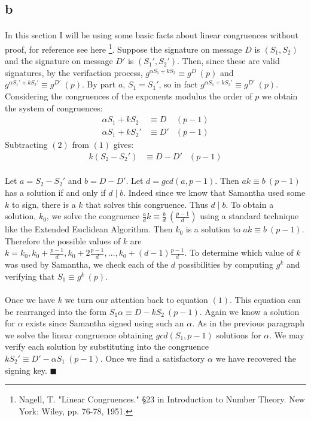 \documentclass[letterpaper,12pt,oneside,onecolumn]{report}
\begin{document}
\subsection*{b}
\paragraph{}
In this section I will be using some basic facts about linear congruences without proof, for reference see here \footnote{Nagell, T. "Linear Congruences." §23 in Introduction to Number Theory. New York: Wiley, pp. 76-78, 1951.}. Suppose the signature on message $D$ is $(S_1,S_2)$ and the signature on message $D'$ is $(S_1', S_2')$. Then, since these are valid signatures, by the verifaction process, $g^{\alpha S_1 + kS_2} \equiv g^D\ (p)$ and $g^{\alpha S_1' + kS_2'} \equiv g^{D'}\ (p)$. By part $a$, $S_1 = S_1'$, so in fact $g^{\alpha S_1 + kS_2'} \equiv g^{D'}\ (p)$. Considering the congruences of the exponents modulus the order of $p$ we obtain the system of congruences:
\begin{align}
\alpha S_1 + k S_2 &\equiv D &(p-1) \\
\alpha S_1 + k S_2' &\equiv D' &(p-1)
\end{align}
Subtracting $(2)$ from $(1)$ gives:
\begin{align}
k(S_2 - S_2') &\equiv D-D' &(p-1)
\end{align}
\paragraph{}
Let $a = S_2 - S_2'$ and $b = D - D'$. Let $d = gcd(a, p-1)$. Then $ak \equiv b\ (p-1)$ has a solution if and only if $d \mid b$. Indeed since we know that Samantha used some $k$ to sign, there is a $k$ that solves this congruence. Thus $d \mid b$. To obtain a solution, $k_0$, we solve the congruence $\frac{a}{d}k \equiv \frac{b}{d}\ (\frac{p-1}{d})$ using a standard technique like the Extended Euclidean Algorithm. Then $k_0$ is a solution to $ak \equiv b\ (p-1)$. Therefore the possible values of $k$ are $k = k_0, k_0 + \frac{p-1}{d}, k_0 + 2\frac{p-1}{d}, \dots, k_0 + (d-1)\frac{p-1}{d}$. To determine which value of $k$ was used by Samantha, we check each of the $d$ possibilities by computing $g^k$ and verifying that $S_1 \equiv g^k\ (p)$.
\paragraph{}
Once we have $k$ we turn our attention back to equation $(1)$. This equation can be rearranged into the form $S_1 \alpha \equiv D - kS_2\ (p-1)$. Again we know a solution for $\alpha$ exists since Samantha signed using such an $\alpha$. As in the previous paragraph we solve the linear congruence obtaining $gcd(S_1, p-1)$ solutions for $\alpha$. We may verify each solution by substituting into the congruence $kS_2' \equiv D' - \alpha S_1\ (p-1)$. Once we find a satisfactory $\alpha$ we have recovered the signing key. $\blacksquare$
\end{document}
